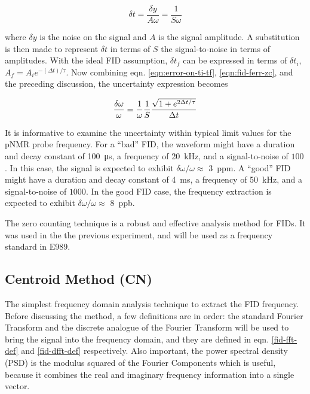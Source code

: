 \begin{equation}
\label{eqn:error-on-ti-tf}
\delta t = \frac{\delta y}{A \omega} = \frac{1}{S \omega}
\end{equation}

\noindent
where $\delta y$ is the noise on the signal and $A$ is the signal amplitude.  A substitution is then made to represent $\delta t$ in terms of $S$ the signal-to-noise in terms of amplitudes.  With the ideal FID assumption, $\delta t_f$ can be expressed in terms of $\delta t_i$, $A_f = A_i e^{-(\Delta t) / \tau}$. Now combining eqn. \ref{eqn:error-on-ti-tf}, \ref{eqn:fid-ferr-zc}, and the preceding discussion, the uncertainty expression becomes

\begin{equation}
\label{eqn:fid-ferr-zc-2}
\frac{\delta \omega}{\omega} = \\
\frac{1}{\omega}\frac{1}{S}
\frac{\sqrt{1 + e^{2 \Delta t / \tau}}}{\Delta t}
\end{equation}

It is informative to examine the uncertainty within typical limit values for the pNMR probe frequency.  For a ``bad'' FID, the waveform might have a duration and decay constant of \SI{100}{\micro \second}, a frequency of \SI{20}{\kHz}, and a signal-to-noise of $100$.  In this case, the signal is expected to exhibit $\delta \omega / \omega \approx$ \SI{3}{ppm}.  A ``good'' FID might have a duration and decay constant of \SI{4}{\milli \second}, a frequency of \SI{50}{\kHz}, and a signal-to-noise of $1000$. In the good FID case, the frequency extraction is expected to exhibit $\delta \omega / \omega \approx$ \SI{8}{ppb}.

The zero counting technique is a robust and effective analysis method for FIDs.  It was used in the the previous \mugmtwo experiment, and will be used as a frequency standard in E989.

\subsection{Centroid Method (CN)}
The simplest frequency domain analysis technique to extract the FID frequency.  Before discussing the method, a few definitions are in order: the standard Fourier Transform and the discrete analogue of the Fourier Transform will be used to bring the signal into the frequency domain, and they are defined in eqn. \ref{fid-fft-def} and \ref{fid-dfft-def} respectively.  Also important, the power spectral density (PSD) is the modulus squared of the Fourier Components which is useful, because it combines the real and imaginary frequency information into a single vector.

